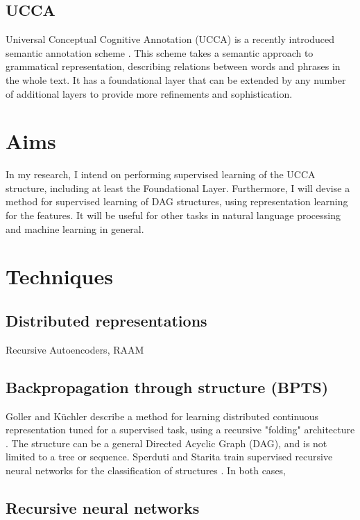 \documentclass[11pt]{article}
\begin{document}
\subsection{UCCA}

Universal Conceptual Cognitive Annotation (UCCA) is a recently introduced semantic annotation scheme \cite{abend2013universal}. This scheme takes a semantic approach to grammatical representation, describing relations between words and phrases in the whole text. It has a foundational layer that can be extended by any number of additional layers to provide more refinements and sophistication.


\section{Aims}

In my research, I intend on performing supervised learning of the UCCA structure, including at least the Foundational Layer. Furthermore, I will devise a method for supervised learning of DAG structures, using representation learning for the features. It will be useful for other tasks in natural language processing and machine learning in general.

\section{Techniques}

\subsection{Distributed representations}

Recursive Autoencoders, RAAM

\subsection{Backpropagation through structure (BPTS)}

Goller and K{\"u}chler describe a method for learning distributed continuous representation tuned for a supervised task, using a recursive "folding" architecture \cite{goller1996learning}. The structure can be a general Directed Acyclic Graph (DAG), and is not limited to a tree or sequence. Sperduti and Starita train supervised recursive neural networks for the classification of structures \cite{sperduti1997supervised}. In both cases, 

\subsection{Recursive neural networks}
\end{document}
